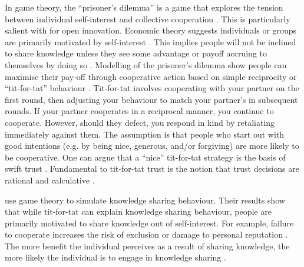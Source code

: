 In game theory, the \enquote{prisoner’s dilemma} is a game that explores the tension between individual self-interest and collective cooperation \citep{richards2001reciprocity}. This is particularly salient with for open innovation. Economic theory suggests individuals or groups are primarily motivated by self-interest \citep{axelrod1984evolution}. This implies people will not be inclined to share knowledge unless they see some advantage or payoff accruing to themselves by doing so \citep{yang2006knowledge}. Modelling of the prisoner's dilemma show people can maximise their pay-off through cooperative action based on simple reciprocity or \enquote{tit-for-tat} behaviour \citep{axelrod1981evolution,richards2001reciprocity}. Tit-for-tat involves cooperating with your partner on the first round, then adjusting your behaviour to match your partner’s in subsequent rounds. If your partner cooperates in a reciprocal manner, you continue to cooperate. However, should they defect, you respond in kind by retaliating immediately against them. The assumption is that people who start out with good intentions (e.g. by being nice, generous, and/or forgiving) are more likely to be cooperative. One can argue that a \enquote{nice} tit-for-tat strategy is the basis of swift trust \citep{fulmer2013trust,mollering2013process}. Fundamental to tit-for-tat trust is the notion that trust decisions are rational and calculative \citep{fulmer2013trust}. \medskip

\citet{yang2006knowledge} use game theory to simulate knowledge sharing behaviour. Their results show that while tit-for-tat can explain knowledge sharing behaviour, people are primarily motivated to share knowledge out of self-interest. For example, failure to cooperate increases the risk of exclusion or damage to personal reputation \citep{blais1987epistemic}. The more benefit the individual perceives as a result of sharing knowledge, the more likely the individual is to engage in knowledge sharing \citep{bock2001breaking,witherspoon2013antecedents}. \medskip




